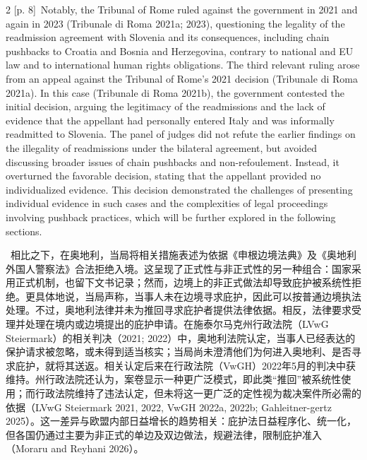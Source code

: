 \documentclass[10pt,a4paper]{article}
\begin{document}
\begin{paracol}{2}
\switchcolumn
{\scriptsize\color{gray} [p. 8]}\ Notably, the Tribunal of Rome ruled against the government in 2021 and again in 2023 (Tribunale di Roma 2021a; 2023), questioning the legality of the readmission agreement with Slovenia and its consequences, including chain pushbacks to Croatia and Bosnia and Herzegovina, contrary to national and EU law and to international human rights obligations. The third relevant ruling arose from an appeal against the Tribunal of Rome’s 2021 decision (Tribunale di Roma 2021a). In this case (Tribunale di Roma 2021b), the government contested the initial decision, arguing the legitimacy of the readmissions and the lack of evidence that the appellant had personally entered Italy and was informally readmitted to Slovenia. The panel of judges did not refute the earlier findings on the illegality of readmissions under the bilateral agreement, but avoided discussing broader issues of chain pushbacks and non-refoulement. Instead, it overturned the favorable decision, stating that the appellant provided no individualized evidence. This decision demonstrated the challenges of presenting individual evidence in such cases and the complexities of legal proceedings involving pushback practices, which will be further explored in the following sections.\par
\switchcolumn*
{\scriptsize\color{gray} [p. 8]}\ 相比之下，在奥地利，当局将相关措施表述为依据《申根边境法典》及《奥地利外国人警察法》合法拒绝入境。这呈现了正式性与非正式性的另一种组合：国家采用正式机制，也留下文书记录；然而，边境上的非正式做法却导致庇护被系统性拒绝。更具体地说，当局声称，当事人未在边境寻求庇护，因此可以按普通边境执法处理。不过，奥地利法律并未为推回寻求庇护者提供法律依据。相反，法律要求受理并处理在境内或边境提出的庇护申请。在施泰尔马克州行政法院（LVwG Steiermark）的相关判决（2021; 2022）中，奥地利法院认定，当事人已经表达的保护请求被忽略，或未得到适当核实；当局尚未澄清他们为何进入奥地利、是否寻求庇护，就将其送返。相关认定后来在行政法院（VwGH）2022年5月的判决中获维持。州行政法院还认为，案卷显示一种更广泛模式，即此类“推回”被系统性使用；而行政法院维持了违法认定，但未将这一更广泛的定性视为裁决案件所必需的依据（LVwG Steiermark 2021, 2022, VwGH 2022a, 2022b; Gahleitner-gertz 2025）。这一差异与欧盟内部日益增长的趋势相关：庇护法日益程序化、统一化，但各国仍通过主要为非正式的单边及双边做法，规避法律，限制庇护准入（Moraru and Reyhani 2026）。\par
\switchcolumn

\end{paracol}
\end{document}
